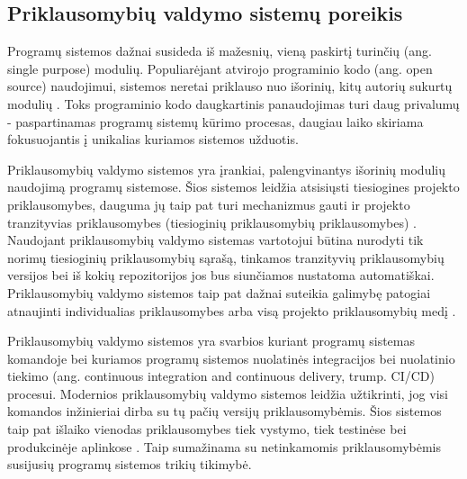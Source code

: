 \subsection{Priklausomybių valdymo sistemų poreikis}

Programų sistemos dažnai susideda iš mažesnių, vieną paskirtį turinčių (ang. single purpose) modulių.
Populiarėjant atvirojo programinio kodo (ang. open source) naudojimui, sistemos neretai priklauso nuo išorinių,
kitų autorių sukurtų modulių \cite{PAD17}. Toks programinio kodo daugkartinis panaudojimas turi daug privalumų - paspartinamas programų
sistemų kūrimo procesas, daugiau laiko skiriama fokusuojantis į unikalias kuriamos sistemos užduotis.

Priklausomybių valdymo sistemos yra įrankiai, palengvinantys išorinių modulių naudojimą programų sistemose.
Šios sistemos leidžia atsisiųsti tiesiogines projekto priklausomybes, dauguma jų taip pat turi mechanizmus gauti
ir projekto tranzityvias priklausomybes (tiesioginių priklausomybių priklausomybes) \cite{PAD17}. Naudojant
priklausomybių valdymo sistemas vartotojui būtina nurodyti tik norimų tiesioginių priklausomybių sąrašą,
tinkamos tranzityvių priklausomybių versijos bei iš kokių repozitorijos jos bus siunčiamos nustatoma
automatiškai. Priklausomybių valdymo sistemos taip pat dažnai suteikia galimybę patogiai atnaujinti individualias
priklausomybes arba visą projekto priklausomybių medį \cite{MAT17}.

Priklausomybių valdymo sistemos yra svarbios kuriant programų sistemas komandoje bei kuriamos programų
sistemos nuolatinės integracijos bei nuolatinio tiekimo (ang. continuous integration and continuous delivery,
trump. CI/CD) procesui. Modernios priklausomybių valdymo sistemos leidžia užtikrinti, jog visi komandos
inžinieriai dirba su tų pačių versijų priklausomybėmis. Šios sistemos taip pat išlaiko vienodas priklausomybes
tiek vystymo, tiek testinėse bei produkcinėje aplinkose \cite{MAT17}. Taip sumažinama su netinkamomis
priklausomybėmis susijusių programų sistemos trikių tikimybė.

